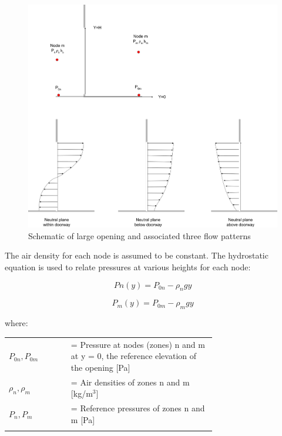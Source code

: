\begin{figure}[hbtp] %
\centering
\includegraphics[width=0.9\linewidth, height=0.9\textheight, keepaspectratio=true]{media/image2708.svg.png}
\caption{Schematic of large opening and associated three flow patterns \protect \label{fig:schematic-of-large-opening-and-associated}}
\end{figure}

The air density for each node is assumed to be constant. The hydrostatic equation is used to relate pressures at various heights for each node:

\begin{equation}
Pn\left( y \right) = {P_{0n}} - {\rho_n}gy
\end{equation}

\begin{equation}
{P_m}(y) = {P_{0m}} - {\rho_m}gy
\end{equation}

where:

\begin{tabular}{lp{0.7\linewidth}}
\\
$P_{0n}, P_{0m}$ &= Pressure at nodes (zones) n and m at y = 0, the reference elevation of the opening [Pa] \\
$\rho_n, \rho_m$ &= Air densities of zones n and m [kg/m\(^{3}\)] \\
$P_n, P_m$ &= Reference pressures of zones n and m [Pa] \\
\\
\end{tabular}

